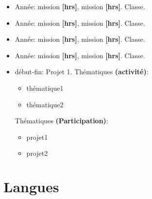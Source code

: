 \documentclass[11pt,a4paper]{moderncv}
\begin{document}
\vspace{-0.55cm}
\begin{itemize}[leftmargin=3cm]
\renewcommand{\labelitemi}{$\star$}
\item \scriptsize Année: mission \textbf{[hrs]}, mission \textbf{[hrs]}.  Classe.
\vspace{-0.125cm}
\item \scriptsize Année: mission \textbf{[hrs]}, mission \textbf{[hrs]}.  Classe.
\vspace{-0.125cm}
\item \scriptsize Année: mission \textbf{[hrs]}, mission \textbf{[hrs]}.  Classe.
\vspace{-0.125cm}
\item \scriptsize Année: mission \textbf{[hrs]}, mission \textbf{[hrs]}.  Classe.
\end{itemize}
\vspace{-0.55cm}
\begin{itemize}[leftmargin=3cm]
\renewcommand{\labelitemi}{$\star$}
\item \scriptsize début-fin: Projet 1.
\newline Thématiques \textbf{(activité)}: 
\vspace{-0.25cm}
\begin{itemize}[leftmargin=0.5cm]
\item \scriptsize thématique1
\vspace{-0.125cm}
\item \scriptsize thématique2
\end{itemize}
\vspace{-0.25cm}
Thématiques \textbf{(Participation)}:
\vspace{-0.25cm}
\begin{itemize}[leftmargin=0.5cm]
\item \scriptsize projet1
\vspace{-0.125cm}
\item \scriptsize projet2
\end{itemize}

\end{itemize}

\section{Langues}
\vspace{-0.125cm}
\vspace{-0.125cm}
\vspace{-0.125cm}
\end{document}
